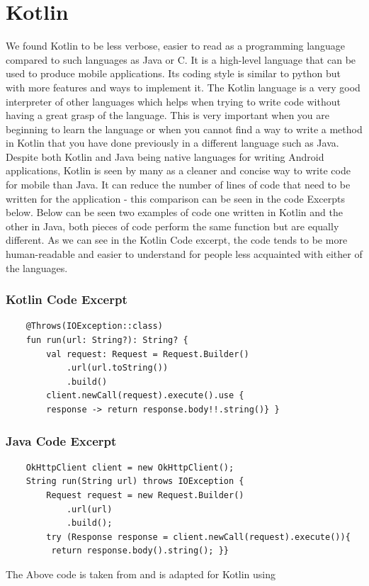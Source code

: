 \section{Kotlin}
We found Kotlin to be less verbose, easier to read as a programming language compared to such languages as Java or C. It is a high-level language that can be used to produce mobile applications. Its coding style is similar to python but with more features and ways to implement it.
\newline \newline
The Kotlin language is a very good interpreter of other languages which helps when trying to write code without having a great grasp of the \newline language. This is very important when you are beginning to learn the language or when you cannot find a way to write a method in Kotlin that you have done previously in a different language such as Java.
\newline \newline
Despite both Kotlin and Java being native languages for writing Android applications, Kotlin is seen by many as a cleaner and concise way to write code for mobile than Java\cite{ref21}\cite{ref22}. It can reduce the number of lines of code that need to be written for the application - this comparison can be seen in the code Excerpts below.
\newline
\newline
Below can be seen two examples of code one written in Kotlin and the other in Java, both pieces of code perform the same function but are equally \newline different. As we can see in the Kotlin Code excerpt, the code tends to be more human-readable and easier to understand for people less acquainted with either of the languages.
\newline

\subsubsection{Kotlin Code Excerpt}
\begin{verbatim}
    @Throws(IOException::class)
    fun run(url: String?): String? {
        val request: Request = Request.Builder()
            .url(url.toString())
            .build()
        client.newCall(request).execute().use {
        response -> return response.body!!.string()} }
\end{verbatim}
\subsubsection{Java Code Excerpt}
\begin{verbatim}
    OkHttpClient client = new OkHttpClient();
    String run(String url) throws IOException {
        Request request = new Request.Builder()
            .url(url)
            .build();
        try (Response response = client.newCall(request).execute()){
         return response.body().string(); }}
\end{verbatim}
The Above code is taken from \cite{ref1} and is adapted for Kotlin using \cite{ref20}
